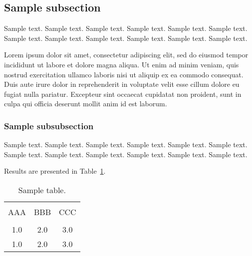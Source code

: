 \documentclass[jou,apacite]{apa6}
\begin{document}
\subsection{Sample subsection}
Sample text. Sample text. Sample text. Sample text. Sample text. Sample text. 
Sample text. Sample text. Sample text. Sample text. Sample text. Sample text. 

Lorem ipsum dolor sit amet, consectetur adipiscing elit, sed do eiusmod tempor incididunt ut labore et dolore magna aliqua. Ut enim ad minim veniam, quis nostrud exercitation ullamco laboris nisi ut aliquip ex ea commodo consequat. Duis aute irure dolor in reprehenderit in voluptate velit esse cillum dolore eu fugiat nulla pariatur. Excepteur sint occaecat cupidatat non proident, sunt in culpa qui officia deserunt mollit anim id est laborum.

\subsubsection{Sample subsubsection}
Sample text. Sample text. Sample text. Sample text. Sample text. Sample text. 
Sample text. Sample text. Sample text. Sample text. Sample text. Sample text. 


Results are presented in Table~\ref{tab1}.
\begin{table}[!htb]
\caption{Sample table.}\label{tab1}
\begin{tabular}{ccc}
\hline\\[-1.5ex]
AAA & BBB & CCC \\[0.5ex]
\hline\\[-1.5ex]
1.0 & 2.0 & 3.0\\[0.5ex]
1.0 & 2.0 & 3.0\\[0.5ex]
\hline
\end{tabular}
\end{table}



\end{document}
